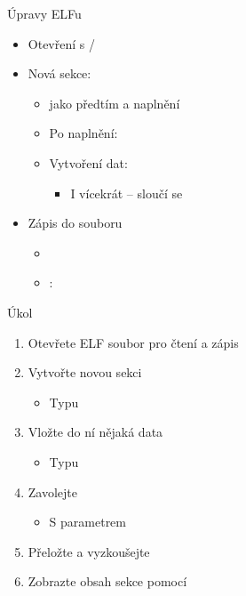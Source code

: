 \begin{frame}[fragile]{}{Úpravy ELFu}

  \begin{itemize}
    \item Otevření s /

    \pause

    \item Nová sekce: 
    \begin{itemize}
      \item {} jako předtím a naplnění
      \item Po naplnění: 
      \item Vytvoření dat: 
      \begin{itemize}
	\item I vícekrát -- sloučí se
      \end{itemize}
    \end{itemize}

    \pause

    \item Zápis do souboru
    \begin{itemize}
      \item {}
      \item {}: 
    \end{itemize}
  \end{itemize}

\end{frame}

\begin{frame}{Úkol}

  \begin{enumerate}
    \item Otevřete ELF soubor pro čtení a zápis
    \item Vytvořte novou sekci 
    \begin{itemize}
      \item Typu 
    \end{itemize}
    \item Vložte do ní nějaká data
    \begin{itemize}
      \item Typu 
    \end{itemize}
    \item Zavolejte 
    \begin{itemize}
      \item S parametrem 
    \end{itemize}
    \item Přeložte a vyzkoušejte
    \item Zobrazte obsah sekce  pomocí 
  \end{enumerate}

\end{frame}
